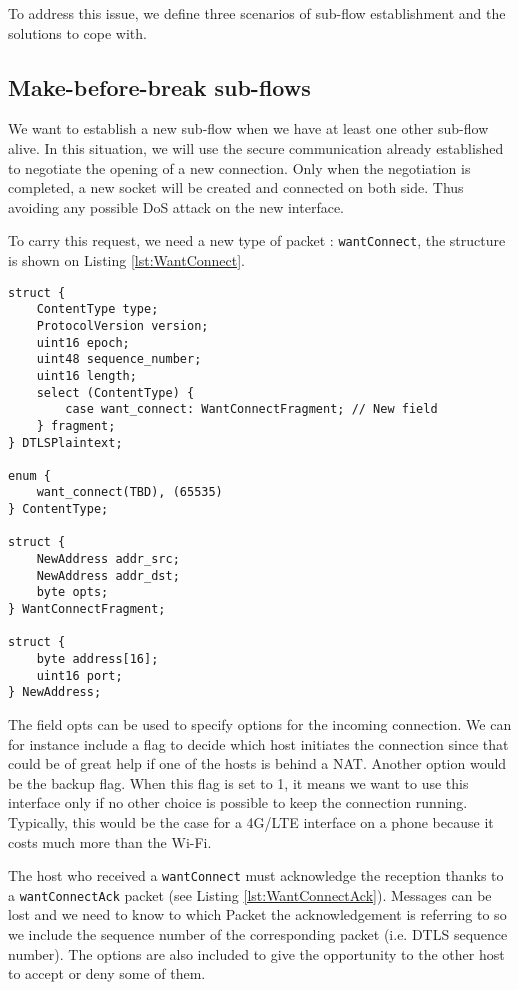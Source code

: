 To address this issue, we define three scenarios of sub-flow establishment and the solutions to cope with.

\subsection{Make-before-break sub-flows}

We want to establish a new sub-flow when we have at least one other sub-flow alive. In this situation, we will use the secure communication already established to negotiate the opening of a new connection. Only when the negotiation is completed, a new socket will be created and connected on both side. Thus avoiding any possible DoS attack on the new interface.

To carry this request, we need a new type of packet : \texttt{wantConnect}, the structure is shown on Listing \ref{lst:WantConnect}.

\begin{lstlisting}[caption= WantConnect message structure, label=lst:WantConnect]
struct {
    ContentType type;
    ProtocolVersion version;
    uint16 epoch;
    uint48 sequence_number;
    uint16 length;
    select (ContentType) {
        case want_connect: WantConnectFragment; // New field
    } fragment;
} DTLSPlaintext;

enum {
    want_connect(TBD), (65535)
} ContentType;

struct {
    NewAddress addr_src;
    NewAddress addr_dst;
    byte opts;
} WantConnectFragment;

struct {
    byte address[16];
    uint16 port;
} NewAddress;
\end{lstlisting}

The field opts can be used to specify options for the incoming connection.  We can for instance include a flag to decide which host initiates the connection since that could be of great help if one of the hosts is behind a NAT. Another option would be the backup flag. When this flag is set to 1, it means we want to use this interface only if no other choice is possible to keep the connection running. Typically, this would be the case for a 4G/LTE interface on a phone because it costs much more than the Wi-Fi.

The host who received a \texttt{wantConnect} must acknowledge the reception thanks to a \texttt{wantConnectAck} packet (see Listing \ref{lst:WantConnectAck}). Messages can be lost and we need to know to which Packet the acknowledgement is referring to so we include the sequence number of the corresponding packet (i.e. DTLS sequence number). The options are also included to give the opportunity to the other host to accept or deny some of them.

